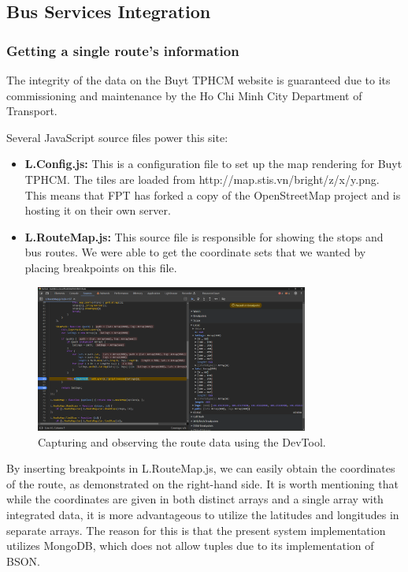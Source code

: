 \subsection{Bus Services Integration}

\subsubsection{Getting a single route's information}

The integrity of the data on the Buyt TPHCM website is guaranteed due to its commissioning and maintenance by the Ho Chi Minh City Department of Transport. 

Several JavaScript source files power this site:
\begin{itemize}
    \item \textbf{L.Config.js:} This is a configuration file to set up the map rendering for Buyt TPHCM. The tiles are loaded from http://map.stis.vn/bright/{z}/{x}/{y}.png. This means that FPT has forked a copy of the OpenStreetMap project and is hosting it on their own server.
    \item \textbf{L.RouteMap.js:} This source file is responsible for showing the stops and bus routes. We were able to get the coordinate sets that we wanted by placing breakpoints on this file.
\end{itemize}

\begin{figure}[H]
    \centering
    \includegraphics[width=0.8\textwidth]{assets/images/Research/Bus/lat_long_web.png}
    \caption{Capturing and observing the route data using the DevTool.}
    \label{fig:lat_long_web}
\end{figure}

By inserting breakpoints in L.RouteMap.js, we can easily obtain the coordinates of the route, as demonstrated on the right-hand side. It is worth mentioning that while the coordinates are given in both distinct arrays and a single array with integrated data, it is more advantageous to utilize the latitudes and longitudes in separate arrays. The reason for this is that the present system implementation utilizes MongoDB, which does not allow tuples due to its implementation of BSON.


